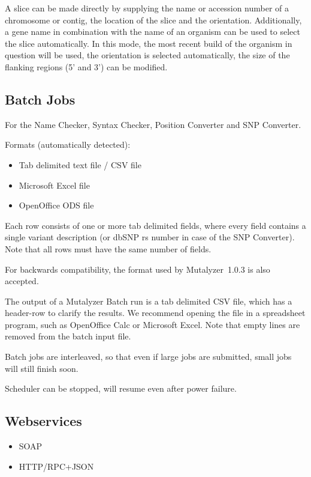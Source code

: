 \documentclass{article}
\begin{document}
A slice can be made directly by supplying the name or accession number of a
chromosome or contig, the location of the slice and the orientation.
Additionally, a gene name in combination with the name of an organism can be
used to select the slice automatically. In this mode, the most recent build of
the organism in question will be used, the orientation is selected
automatically, the size of the flanking regions (5' and 3') can be modified.

\subsection{Batch Jobs} \label{subsec:batch}
For the Name Checker, Syntax Checker, Position Converter and SNP Converter.

Formats (automatically detected):
\begin{itemize}
  \item Tab delimited text file / CSV file
  \item Microsoft Excel file
  \item OpenOffice ODS file
\end{itemize}

Each row consists of one or more tab delimited fields, where every field
contains a single variant description (or dbSNP rs number in case of the SNP
Converter). Note that all rows must have the same number of fields.

For backwards compatibility, the format used by Mutalyzer~1.0.3 is also
accepted.

The output of a Mutalyzer Batch run is a tab delimited CSV file, which has a
header-row to clarify the results. We recommend opening the file in a
spreadsheet program, such as OpenOffice Calc or Microsoft Excel. Note that
empty lines are removed from the batch input file.

Batch jobs are interleaved, so that even if large jobs are submitted, small
jobs will still finish soon.

Scheduler can be stopped, will resume even after power failure.

\subsection{Webservices}
\begin{itemize}
  \item SOAP
  \item HTTP/RPC+JSON
\end{itemize}
\end{document}
